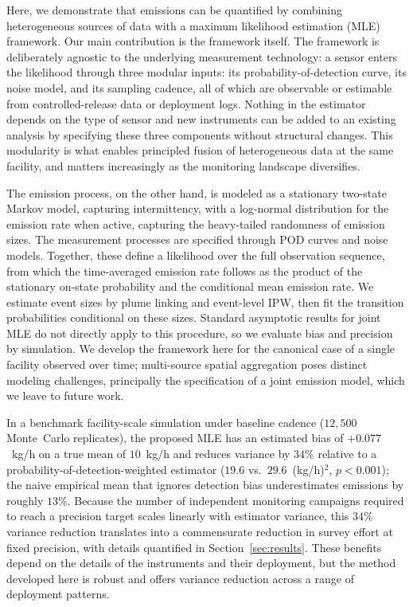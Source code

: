 \documentclass[numsec,webpdf,modern,mediumone]{oup-authoring-template}
\newcommand{\new}[1]{#1}
\newcommand{\edit}[1]{#1}
\begin{document}
Here, we demonstrate that emissions can be quantified by combining heterogeneous sources of data with a maximum likelihood estimation (MLE) framework.
Our main contribution is the framework itself. \edit{The framework is deliberately agnostic to the underlying measurement technology: a sensor enters the likelihood through three modular inputs: its probability-of-detection curve, its noise model, and its sampling cadence, all of which are observable or estimable from controlled-release data or deployment logs. Nothing in the estimator depends on the type of sensor and new instruments can be added to an existing analysis by specifying these three components without structural changes.}
This modularity is what enables principled fusion of heterogeneous data at the same facility, and matters increasingly as the monitoring landscape diversifies.

The emission process, on the other hand, is modeled as a stationary two-state Markov model, capturing intermittency, with a log-normal distribution for the emission rate when active, capturing the heavy-tailed randomness of emission sizes. The measurement processes are specified through POD curves and noise models. Together, these define a likelihood over the full observation sequence, from which the time-averaged emission rate follows as the product of the stationary on-state probability and the conditional mean emission rate. We estimate event sizes by plume linking and event-level IPW, then fit the transition probabilities conditional on these sizes. Standard asymptotic results for joint MLE do not directly apply to this procedure, so we evaluate bias and precision by simulation.
\edit{We develop the framework here for the canonical case of a single facility observed over time; multi-source spatial aggregation poses distinct modeling challenges, principally the specification of a joint emission model, which we leave to future work.}

\new{In a benchmark facility-scale simulation under baseline cadence ($12{,}500$ Monte~Carlo replicates), the proposed MLE has an estimated bias of $+0.077$~kg/h on a true mean of $10$~kg/h and reduces variance by $34\%$ relative to a probability-of-detection-weighted estimator (\edit{$19.6$} vs.~\edit{$29.6$}~(kg/h)$^2$, $p < 0.001$); the naive empirical mean that ignores detection bias underestimates emissions by roughly $13\%$. Because the number of independent monitoring campaigns required to reach a precision target scales linearly with estimator variance, this $34\%$ variance reduction translates into a commensurate reduction in survey effort at fixed precision, with details quantified in Section~\ref{sec:results}.} These benefits depend on the details of the instruments and their deployment, but the method developed here is robust and offers variance reduction across a range of deployment patterns.
\end{document}
